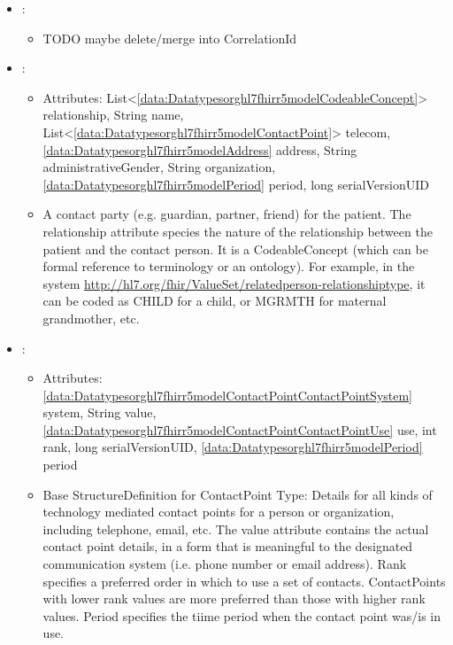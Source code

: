 \begin{itemize}[nolistsep,noitemsep]
\item {}: 
\begin{itemize}[noitemsep,nolistsep]

\item[] TODO maybe delete/merge into CorrelationId

\end{itemize}

\item {}: 
\begin{itemize}[noitemsep,nolistsep]
\item[] Attributes: List\textless{}\ref{data:Datatypesorghl7fhirr5modelCodeableConcept}\textgreater{} relationship, String name, List\textless{}\ref{data:Datatypesorghl7fhirr5modelContactPoint}\textgreater{} telecom, \ref{data:Datatypesorghl7fhirr5modelAddress} address, String administrativeGender, String organization, \ref{data:Datatypesorghl7fhirr5modelPeriod} period, long serialVersionUID
\item[] A contact party (e.g. guardian, partner, friend) for the patient.
The relationship attribute species the nature of the relationship between the patient and the contact person.
It is a CodeableConcept (which can be formal reference to terminology or an ontology).
For example, in the system \url{http://hl7.org/fhir/ValueSet/relatedperson-relationshiptype}, it can be coded as CHILD for a child, or MGRMTH for maternal grandmother, etc.
\end{itemize}

\item {}: 
\begin{itemize}[noitemsep,nolistsep]
\item[] Attributes: \ref{data:Datatypesorghl7fhirr5modelContactPointContactPointSystem} system, String value, \ref{data:Datatypesorghl7fhirr5modelContactPointContactPointUse} use, int rank, long serialVersionUID, \ref{data:Datatypesorghl7fhirr5modelPeriod} period
\item[] Base StructureDefinition for ContactPoint Type: Details for all kinds of technology mediated contact points for a person or organization, including telephone, email, etc.
The value attribute contains the actual contact point details, in a form that is meaningful to the designated communication system (i.e. phone number or email address).
Rank specifies a preferred order in which to use a set of contacts. ContactPoints with lower rank values are more preferred than those with higher rank values.
Period specifies the tiime period when the contact point was/is in use.


\end{itemize}
\end{itemize}
